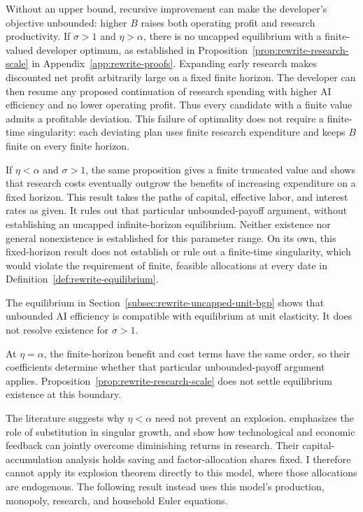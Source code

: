 Without an upper bound, recursive improvement can make the developer's objective unbounded: higher $B$ raises both operating profit and research productivity. If $\sigma>1$ and $\eta>\alpha$, there is no uncapped equilibrium with a finite-valued developer optimum, as established in Proposition~\ref{prop:rewrite-research-scale} in Appendix~\ref{app:rewrite-proofs}. Expanding early research makes discounted net profit arbitrarily large on a fixed finite horizon. The developer can then resume any proposed continuation of research spending with higher AI efficiency and no lower operating profit. Thus every candidate with a finite value admits a profitable deviation. This failure of optimality does not require a finite-time singularity: each deviating plan uses finite research expenditure and keeps $B$ finite on every finite horizon. %

If $\eta<\alpha$ and $\sigma>1$, the same proposition gives a finite truncated value and shows that research costs eventually outgrow the benefits of increasing expenditure on a fixed horizon. This result takes the paths of capital, effective labor, and interest rates as given. It rules out that particular unbounded-payoff argument, without establishing an uncapped infinite-horizon equilibrium. Neither existence nor general nonexistence is established for this parameter range. On its own, this fixed-horizon result does not establish or rule out a finite-time singularity, which would violate the requirement of finite, feasible allocations at every date in Definition~\ref{def:rewrite-equilibrium}.

The equilibrium in Section~\ref{subsec:rewrite-uncapped-unit-bgp} shows that
unbounded AI efficiency is compatible with equilibrium at unit elasticity.
It does not resolve existence for $\sigma>1$.

At $\eta=\alpha$, the finite-horizon benefit and cost terms have the same
order, so their coefficients determine whether that particular
unbounded-payoff argument applies. Proposition~\ref{prop:rewrite-research-scale}
does not settle equilibrium existence at this boundary.

The literature suggests why $\eta<\alpha$ need not prevent an explosion.
\citet{nordhaus2021} emphasizes the role of substitution in singular growth,
and \citet{davidsonetal2026} show how technological and economic feedback
can jointly overcome diminishing returns in research. Their capital-accumulation
analysis holds saving and factor-allocation shares fixed. I therefore cannot
apply its explosion theorem directly to this model, where those allocations
are endogenous. The following result instead uses this model's production,
monopoly, research, and household Euler equations.

